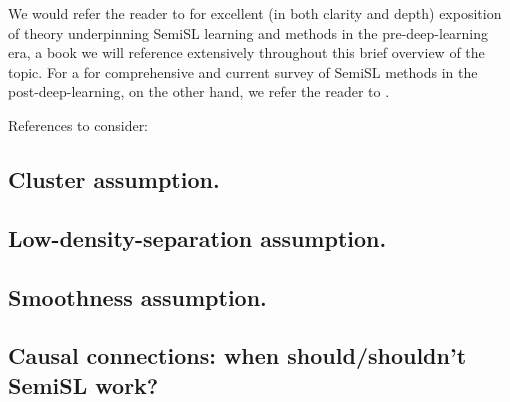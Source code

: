 We would refer the reader to \cite{chapelle2009semi} for excellent (in both clarity and depth)
exposition of theory underpinning SemiSL learning and methods in the pre-deep-learning era, a book
we will reference extensively throughout this brief overview of the topic.
%
For a for comprehensive and current survey of SemiSL methods in the post-deep-learning, on the
other hand, we refer the reader to \cite{yang2022survey}.

%
References to consider:
\cite{chapelle2009semi, scholkopf2021toward, lienen2021credal, sohn2020fixmatch, tarvainen2017mean,
blum1998combining, gong2021alphamatch}
%

\subsection{Cluster assumption.}\label{ssec:cluster-assumption}
%
\subsection{Low-density-separation assumption.}\label{ssec:lds-assumption}
%
\subsection{Smoothness assumption.}\label{ssec:smoothness-assumption}
\subsection{
  Causal connections: when should/shouldn't SemiSL work?
}\label{ssec:semisl-causality}

